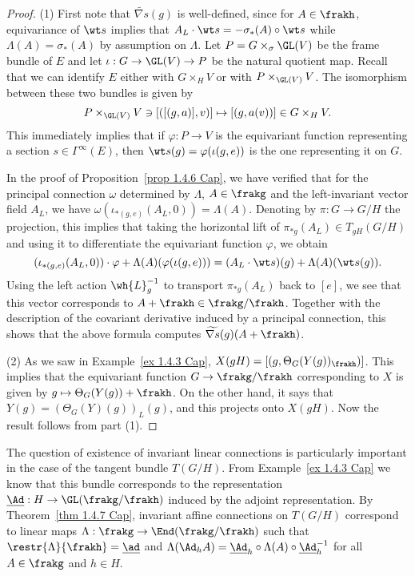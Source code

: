 \begin{proof}
    (1) First note that $\widetilde{\nabla s}(g)$ is well-defined, since for $A\in\frakh$, equivariance of $\wt s$ implies that $A_L\cdot \wt s=-\sigma_\ast(A)\circ \wt s$ while $\Lambda(A)=\sigma_\ast(A)$ by assumption on $\Lambda$. Let $P=G\times_\sigma \GL(V)$ be the frame bundle of $E$ and let $\iota:G\to \GL(V)\to P$ be the natural quotient map. Recall that we can identify $E$ either with $G\times_H V$ or with $P\times_{\GL(V)}V$. The isomorphism between these two bundles is given by 
    \[P\times_{\GL(V)} V\ni [([(g,a)],v)]\mapsto [(g,a(v))]\in G\times_H V.\]
    This immediately implies that if $\varphi:P\to V$ is the equivariant function representing a section $s\in\Gamma^\infty(E)$, then $\wt s(g)=\varphi(\iota(g,e))$ is the one representing it on $G$.

    In the proof of Proposition~\ref{prop 1.4.6 Cap}, we have verified that for the principal connection $\omega$ determined by $\Lambda$, $A\in\frakg$  and the left-invariant vector field $A_L$, we have $\omega(\iota_{\ast(g,e)}(A_L,0))=\Lambda(A)$. Denoting by $\pi:G\to G\slash H$ the projection, this implies that taking the horizontal lift of $\pi_{\ast g}(A_L)\in T_{gH}(G\slash H)$ and using it to differentiate the equivariant function $\varphi$, we obtain 
    \[(\iota_{\ast(g,e)}(A_L,0))\cdot\varphi+\Lambda(A)(\varphi(\iota(g,e)))=(A_L\cdot \wt s)(g)+\Lambda(A)(\wt s(g)).\]
    Using the left action $\wh{L}_g^{-1}$ to transport $\pi_{\ast g}(A_L)$ back to $[e]$, we see that this vector corresponds to $A+\frakh\in\frakg\slash\frakh$. Together with the description of the covariant derivative induced by a principal connection, this shows that the above formula computes $\widetilde{\nabla s}(g)(A+\frakh)$.

    (2) As we saw in Example~\ref{ex 1.4.3 Cap}, $X(gH)=[(g,\Theta_G(Y(g))_\frakh)]$. This implies that the equivariant function $G\to \frakg\slash \frakh$ corresponding to $X$ is given by $g\mapsto \Theta_G(Y(g))+\frakh$. On the other hand, it says that $Y(g)=(\Theta_G(Y)(g))_L(g)$, and this projects onto $X(gH)$. Now the result follows from part (1).
\end{proof}


The question of existence of invariant linear connections is particularly important in the case of the tangent bundle $T(G\slash H)$. From Example~\ref{ex 1.4.3 Cap} we know that this bundle corresponds to the representation $\underline{\Ad}:H\to \GL(\frakg\slash\frakh)$ induced by the adjoint representation. By Theorem~\ref{thm 1.4.7 Cap}, invariant affine connections on $T(G\slash H)$ correspond to linear maps $\Lambda:\frakg\to \End(\frakg\slash\frakh)$ such that $\restr{\Lambda}{\frakh}=\underline{\ad}$ and $\Lambda(\Ad_h A)=\underline{\Ad}_h\circ\Lambda(A)\circ \underline{\Ad}_h^{-1}$ for all $A\in\frakg$ and $h\in H$.

